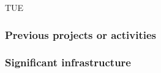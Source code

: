 \begin{sitedescription}{TUE}
\begin{compactenum}
\item {}
\end{compactenum}

\subsubsection*{Previous projects or activities}

\begin{compactenum}
\item {}
\end{compactenum}

\subsubsection*{Significant infrastructure}

\end{sitedescription}

